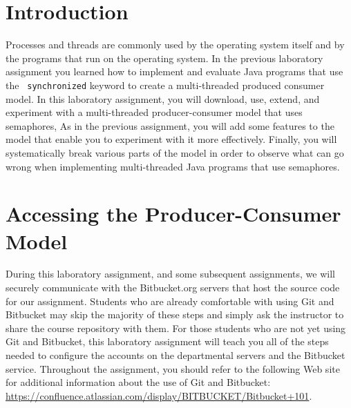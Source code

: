 


\usepackage[compact]{titlesec}


\section*{Introduction}

Processes and threads are commonly used by the operating system itself and by the programs that run on the operating
system. In the previous laboratory assignment you learned how to implement and evaluate Java programs that use the {\tt
  synchronized} keyword to create a multi-threaded produced consumer model. In this laboratory assignment, you will
download, use, extend, and experiment with a multi-threaded producer-consumer model that uses semaphores,  As in the
previous assignment, you will add some features to the model that enable you to experiment with it more effectively.
Finally, you will systematically break various parts of the model in order to observe what can go wrong when
implementing multi-threaded Java programs that use semaphores.

\section*{Accessing the Producer-Consumer Model}

During this laboratory assignment, and some subsequent assignments, we will securely communicate with the Bitbucket.org
servers that host the source code for our assignment. Students who are already comfortable with using Git and Bitbucket
may skip the majority of these steps and simply ask the instructor to share the course repository with them.  For those
students who are not yet using Git and Bitbucket, this laboratory assignment will teach you all of the steps needed to
configure the accounts on the departmental servers and the Bitbucket service.  Throughout the assignment, you should
refer to the following Web site for additional information about the use of Git and Bitbucket:
\url{https://confluence.atlassian.com/display/BITBUCKET/Bitbucket+101}.  

